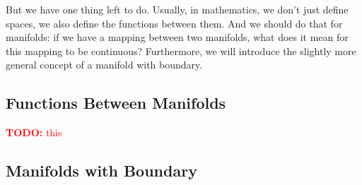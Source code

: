 \documentclass{article}
\newcommand{\TODO}[1]{\textcolor{red}{\textbf{TODO:} #1}}
\begin{document}
But we have one thing left to do. Usually, in mathematics, we don't just define spaces, we also define the functions between them. And we should do that for manifolds: if we have a mapping between two manifolds, what does it mean for this mapping to be continuous? Furthermore, we will introduce the slightly more general concept of a manifold with boundary.

\subsection{Functions Between Manifolds}

\TODO{this}

\subsection{Manifolds with Boundary}
\end{document}
